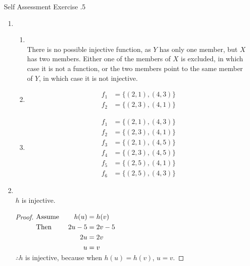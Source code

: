 \documentclass[../notes.tex]{subfiles}
\begin{document}
				\begin{exercise}{Self Assessment Exercise \thechapter.5}
					\begin{enumerate}
						\item {}
							\begin{enumerate}
								\item {}\\
									There is no possible injective function, as $Y$ has only one member, but $X$ has two members. Either one of the members of $X$ is excluded, in which case it is not a function, or the two members point to the same member of $Y$, in which case it is not injective.
								\item {}
									\begin{align*}
										f_{1} &= \bigl\{(2, 1), (4, 3)\bigr\}\\
										f_{2} &= \bigl\{(2, 3), (4, 1)\bigr\}
									\end{align*}
								\item {}
									\begin{align*}
										f_{1} &= \bigl\{(2, 1), (4, 3)\bigr\}\\
										f_{2} &= \bigl\{(2, 3), (4, 1)\bigr\}\\
										f_{3} &= \bigl\{(2, 1), (4, 5)\bigr\}\\
										f_{4} &= \bigl\{(2, 3), (4, 5)\bigr\}\\
										f_{5} &= \bigl\{(2, 5), (4, 1)\bigr\}\\
										f_{6} &= \bigl\{(2, 5), (4, 3)\bigr\}
									\end{align*}
							\end{enumerate}
						\item {}\\
							$h$ is injective.
							\begin{proof} $
								\begin{alignedat}[t]{2}
									& \text{Assume } \quad &h(u) &= h(v)\\
									& \text{Then } &2u - 5 &= 2v - 5\\
									& & 2u &= 2v\\
									& & u &= v
								\end{alignedat} $\\
								$\therefore h$ is injective, because when $h(u) = h(v)$, $u = v$.
							\end{proof}
					\end{enumerate}
				\end{exercise}
			\pagebreak
\end{document}
